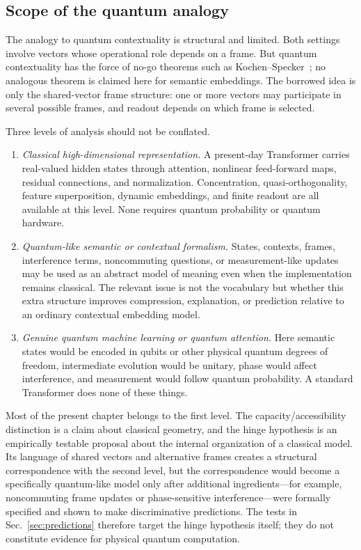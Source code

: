 \documentclass[
  aps,
  reprint,
  superscriptaddress,
  floatfix,
  nofootinbib,
  longbibliography
]{revtex4-2}
\begin{document}
\subsection{Scope of the quantum analogy}
\label{sec:quantum}

The analogy to quantum contextuality is structural and limited. Both
settings involve vectors whose operational role depends on a frame.
But quantum contextuality has the force of no-go theorems such as
Kochen--Specker~\cite{specker-60,kochen1}; no analogous theorem is
claimed here for semantic embeddings. The borrowed idea is only the
shared-vector frame structure: one or more vectors may participate in
several possible frames, and readout depends on which frame is selected.

Three levels of analysis should not be conflated.
%
\begin{enumerate}
\item \emph{Classical high-dimensional representation.}
A present-day Transformer carries real-valued hidden states through
attention, nonlinear feed-forward maps, residual connections, and
normalization.  Concentration, quasi-orthogonality, feature superposition,
dynamic embeddings, and finite readout are all available at this level.
None requires quantum probability or quantum hardware.

\item \emph{Quantum-like semantic or contextual formalism.}
States, contexts, frames, interference terms, noncommuting questions, or
measurement-like updates may be used as an abstract model of meaning even
when the implementation remains classical.  The relevant issue is not the
vocabulary but whether this extra structure improves compression,
explanation, or prediction relative to an ordinary contextual embedding
model.

\item \emph{Genuine quantum machine learning or quantum attention.}
Here semantic states would be encoded in qubits or other physical quantum
degrees of freedom, intermediate evolution would be unitary, phase would
affect interference, and measurement would follow quantum probability.  A
standard Transformer does none of these things.
\end{enumerate}
%

Most of the present chapter belongs to the first level.  The
capacity/accessibility distinction is a claim about classical geometry, and
the hinge hypothesis is an empirically testable proposal about the internal
organization of a classical model.  Its language of shared vectors and
alternative frames creates a structural correspondence with the second
level, but the correspondence would become a specifically quantum-like
model only after additional ingredients---for example, noncommuting frame
updates or phase-sensitive interference---were formally specified and shown
to make discriminative predictions.  The tests in
Sec.~\ref{sec:predictions} therefore target the hinge hypothesis itself; they
do not constitute evidence for physical quantum computation.
\end{document}
